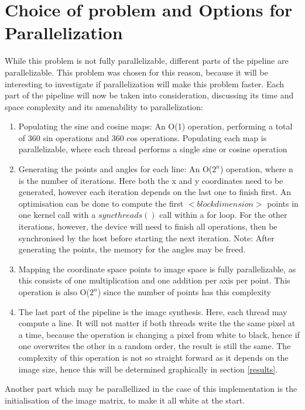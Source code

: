\section{Choice of problem and Options for Parallelization}
While this problem is not fully parallelizable, different parts of the pipeline are parallelizable. This problem was chosen for this reason, because it will be interesting to investigate if parallelization will make this problem faster. Each part of the pipeline will now be taken into consideration, discussing its time and space complexity and its amenability to parallelization:

\begin{enumerate}
	\item Populating the sine and cosine maps: An O(1) operation, performing a total of 360 sin operations and 360 cos operations. Populating each map is parallelizable, where each thread performs a single sine or cosine operation
	\item Generating the points and angles for each line: An O($2^n$) operation, where n is the number of iterations. Here both the x and y coordinates need to be generated, however each iteration depends on the last one to finish first. An optimisation can be done to compute the first $<block dimension>$ points in one kernel call with a $syncthreads()$ call within a for loop. For the other iterations, however, the device will need to finish all operations, then be synchronised by the host before starting the next iteration. Note: After generating the points, the memory for the angles may be freed.
	\item Mapping the coordinate space points to image space is fully parallelizable, as this consists of one multiplication and one addition per axis per point. This operation is also O($2^n$) since the number of points has this complexity
	\item The last part of the pipeline is the image synthesis. Here, each thread may compute a line. It will not matter if both threads write the the same pixel at a time, because the operation is changing a pixel from white to black, hence if one overwrites the other in a random order, the result is still the same. The complexity of this operation is not so straight forward as it depends on the image size, hence this will be determined graphically in section \ref{results}.
\end{enumerate}

Another part which may be parallellized in the case of this implementation is the initialisation of the image matrix, to make it all white at the start.

